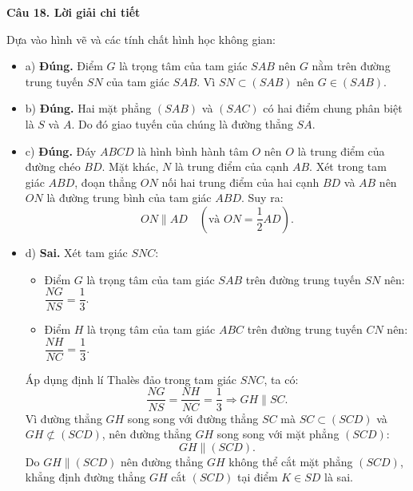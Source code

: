 \documentclass[12pt, a4paper]{article}
\begin{document}
\noindent\textbf{Câu 18. Lời giải chi tiết}\par
\begin{tcolorbox}[enhanced,breakable,colback=solutionbg,colframe=secondary!50!black,frame hidden,borderline west={3pt}{0pt}{secondary!50!black}]
Dựa vào hình vẽ và các tính chất hình học không gian:
\begin{itemize}[leftmargin=1.5em]
\item a) \textbf{Đúng.} Điểm $G$ là trọng tâm của tam giác $SAB$ nên $G$ nằm trên đường trung tuyến $SN$ của tam giác $SAB$. Vì $SN \subset (SAB)$ nên $G \in (SAB)$.

\item b) \textbf{Đúng.} Hai mặt phẳng $(SAB)$ và $(SAC)$ có hai điểm chung phân biệt là $S$ và $A$. Do đó giao tuyến của chúng là đường thẳng $SA$.

\item c) \textbf{Đúng.} Đáy $ABCD$ là hình bình hành tâm $O$ nên $O$ là trung điểm của đường chéo $BD$. Mặt khác, $N$ là trung điểm của cạnh $AB$. Xét trong tam giác $ABD$, đoạn thẳng $ON$ nối hai trung điểm của hai cạnh $BD$ và $AB$ nên $ON$ là đường trung bình của tam giác $ABD$. Suy ra:
$$ON \parallel AD\quad \left(\text{và } ON = \dfrac{1}{2}AD\right).$$

\item d) \textbf{Sai.} Xét tam giác $SNC$:
\begin{itemize}
\item Điểm $G$ là trọng tâm của tam giác $SAB$ trên đường trung tuyến $SN$ nên: $\dfrac{NG}{NS} = \dfrac{1}{3}$.
\item Điểm $H$ là trọng tâm của tam giác $ABC$ trên đường trung tuyến $CN$ nên: $\dfrac{NH}{NC} = \dfrac{1}{3}$.
\end{itemize}
Áp dụng định lí Thalès đảo trong tam giác $SNC$, ta có:
$$\dfrac{NG}{NS} = \dfrac{NH}{NC} = \dfrac{1}{3} \Rightarrow GH \parallel SC.$$
Vì đường thẳng $GH$ song song với đường thẳng $SC$ mà $SC \subset (SCD)$ và $GH \not\subset (SCD)$, nên đường thẳng $GH$ song song với mặt phẳng $(SCD)$:
$$GH \parallel (SCD).$$
Do $GH \parallel (SCD)$ nên đường thẳng $GH$ không thể cắt mặt phẳng $(SCD)$, khẳng định đường thẳng $GH$ cắt $(SCD)$ tại điểm $K \in SD$ là sai.
\end{itemize}
\end{tcolorbox}
\end{document}
